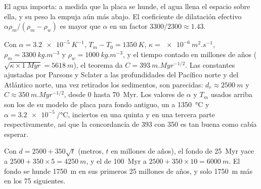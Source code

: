 El agua importa: a medida que la placa se hunde, el agua llena el espacio sobre ella, y su peso la empuja aún más abajo. El coeficiente de
dilatación efectivo $\alpha\rho_m/(\rho_m - \rho_w)$ es mayor que $\alpha$ en un factor $3300/2300 \approx 1.43$.

Con $\alpha = \qty{3.2e-5}{K^{-1}}$, $T_m - T_0 = \qty{1350}{K}$, $\kappa = \qty{e-6}{m^2.s^{-1}}$, $\rho_m = \qty{3300}{kg.m^{-3}}$ y
$\rho_w = \qty{1000}{kg.m^{-3}}$, y el tiempo contado en millones de años ($\sqrt{\kappa\times\qty{1}{Myr}} = \qty{5618}{m}$), el teorema
da $C = \qty{393}{m.Myr^{-1/2}}$. Las constantes ajustadas por Parsons y Sclater a las profundidades del Pacífico norte y del Atlántico norte,
una vez retirados los sedimentos, son parecidas: $d_r \approx \qty{2500}{m}$ y $C \approx \qty{350}{m.Myr^{-1/2}}$, desde 0 hasta
\qty{70}{Myr}. Los valores de $\alpha$ y $T_m$ usados arriba son los de su modelo de placa para fondo antiguo, un  a
\qty{1350}{\degreeCelsius} y $\alpha = \qty{3.2e-5}{\per\degreeCelsius}$, inciertos en una quinta y en una tercera parte respectivamente,
así que la concordancia de 393 con 350 es tan buena como cabía esperar.

\begin{example}\label{ex:b1:rifts-ridges-margins:depths}
Con $d = 2500 + 350\sqrt t$ (metros, $t$ en millones de años), el fondo de \qty{25}{Myr} yace a $2500 + 350\times5 = \qty{4250}{m}$, y el de
\qty{100}{Myr} a $2500 + 350\times10 = \qty{6000}{m}$. El fondo se hunde \qty{1750}{m} en sus primeros 25 millones de años, y solo
\qty{1750}{m} más en los 75 siguientes.
\end{example}

